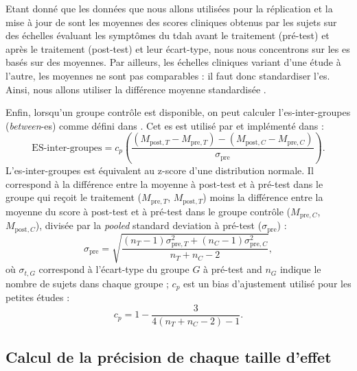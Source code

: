 Etant donné que les données que nous allons utilisées pour la réplication et la mise à jour de \citet{Cortese2016} sont les moyennes des 
scores cliniques obtenus par les sujets sur des échelles évaluant les symptômes du \gls{tdah} avant le traitement (pré-test) et 
après le traitement (post-test) et leur écart-type, nous nous concentrons sur 
les \gls{es} basés sur des moyennes. Par ailleurs, les échelles cliniques variant 
d'une étude à l'autre, les moyennes ne sont pas comparables : il faut donc standardiser l'\gls{es}. 
Ainsi, nous allons utiliser la différence moyenne standardisée \citep{Cortese2016, Micoulaud2014}.

Enfin, lorsqu'un groupe contrôle est disponible, on peut calculer l'\gls{es}-inter-groupes (\textit{between}-\gls{es}) comme défini dans \citet{Morris2008}.
Cet \gls{es} est utilisé par \citet{Cortese2016, Micoulaud2014} et implémenté dans \citet{Bussalb2019} :
\begin{equation}
\label{eq:metareview_effect_size_between}
\text{ES-inter-groupes} = c_p \left(\frac{(M_{\text{post},T} - M_{\text{pre},T}) - (M_{\text{post},C} - M_{\text{pre},C}) }{\sigma_{\text{pre}}} \right).
\end{equation} 
L'\gls{es}-inter-groupes est équivalent au z-score d'une distribution normale. Il correspond à la différence entre la moyenne à post-test et à pré-test 
dans le groupe qui reçoit le traitement ($M_{\text{pre},T}$, $M_{\text{post},T}$) moins la différence entre la moyenne du score à post-test et à pré-test 
dans le groupe contrôle ($M_{\text{pre},C}$, $M_{\text{post},C}$), divisée par la \textit{pooled} standard deviation à pré-test ($\sigma_{\text{pre}}$) :
\begin{equation}
\label{eq:stats_metareview_std_pre}
\sigma_{\text{pre}} = \sqrt{\frac{(n_T - 1)\sigma_{\text{pre},T}^2 + (n_C - 1)\sigma_{\text{pre},C}^2} {n_T + n_C - 2}},
\end{equation}
où $\sigma_{t,G}$ correspond à l'écart-type du groupe $G$ à pré-test and $n_G$ indique le nombre de sujets dans chaque groupe ; 
$c_p$ est un bias d'ajustement utilisé pour les petites études :
\begin{equation}
\label{eq:metareview_correction_factor}
c_p =  1 - \frac{3} {4(n_T + n_C - 2) - 1}. 
\end{equation} 

\subsection{Calcul de la précision de chaque taille d'effet}

